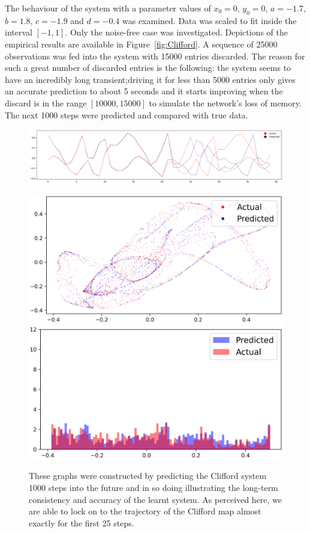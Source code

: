 The behaviour of the system with a parameter values of $x_0=0$, $y_0=0$, $a = -1.7$,  $b = 1.8$, $c = -1.9$ and $d = -0.4$ was examined. 
Data was scaled to fit inside the interval $[-1,1]$. Only the noise-free case was investigated. 
Depictions of the empirical results are available in Figure~\ref{fig:Clifford}.
 A sequence of 25000 observations was fed into the system with 15000 entries discarded. 
 The reason for such a great number of discarded entries is the following: the system seems to have an incredibly long transient;driving it for less than 5000 entries only gives an accurate prediction to about 5 seconds and it starts improving when the discard is in the range $[10000,15000]$ to simulate the network's loss of memory. The next 1000 steps were predicted and compared with true data.


\begin{figure}[ht]
  \centering
  \includegraphics[width=\textwidth,left]{Graphs/_Clifford_1_nonoise.eps}
  \caption*{These graphs were constructed by predicting the Clifford system 1000 steps into the future and in so doing illustrating the long-term consistency and accuracy of the learnt system. As perceived here, we are able to lock on to the trajectory of the Clifford map almost exactly for the first 25 steps.}
      \centering
      \includegraphics[width=\linewidth]{Graphs/_Clifford_2_nonoise.eps}
  \endminipage\hfill
    \centering
    \includegraphics[width=\linewidth]{Graphs/_Clifford_3_nonoise.eps}

\end{figure}
